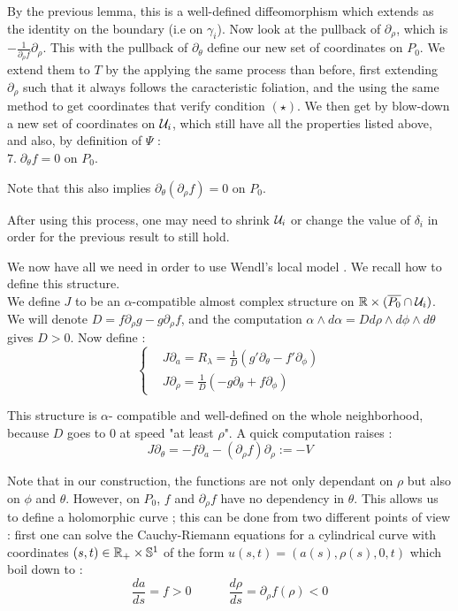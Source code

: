 \documentclass[../main.tex]{subfiles}
\begin{document}
By the previous lemma, this is a well-defined diffeomorphism which extends as the identity on the boundary (i.e on $\gamma_i$). Now look at the pullback of $\partial_\rho$, which is $-\frac{1}{\partial_\rho f}\partial_\rho$. This with the pullback of $\partial_\theta$ define our new set of coordinates on $P_0$. We extend them to $T$ by the applying the same process than before, first extending $\partial_\rho$ such that it always follows the caracteristic foliation, and the using the same method to get coordinates that verify condition $(\star)$. We then get by blow-down a new set of coordinates on $\mathcal{U}_i$, which still have all the properties listed above, and also, by definition of $\Psi$ :\\

$7. \; \partial_\theta f = 0 $ on $P_0$.

\begin{remark}
    Note that this also implies $\partial_\theta(\partial_\rho f) =0$ on $P_0$.
\end{remark}

\begin{remark}
    After using this process, one may need to shrink $\mathcal{U}_i$ or change the value of $\delta_i$ in order for the previous result to still hold.
\end{remark}

We now have all we need in order to use Wendl's local model \cite{wendl_open_2009}. We recall how to define this structure.\\

We define $J$ to be an $\alpha$-compatible almost complex structure on $\mathbb{R}\times (\overline{P_0}\cap \mathcal{U}_i)$. We will denote $D = f\partial_\rho g - g\partial_\rho f$, and the computation $\alpha\wedge d\alpha = Dd\rho\wedge d\phi\wedge d\theta$ gives $D>0$. Now define :
$$\left\{
    \begin{array}{ll}
        & J\partial_a = R_\lambda = \frac{1}{D}(g'\partial_\theta - f'\partial_\phi) \\
        & J\partial_\rho = \frac{1}{D}(-g\partial_\theta + f\partial_\phi) 
    \end{array}
\right.$$

This structure is $\alpha$- compatible and well-defined on the whole neighborhood, because $D$ goes to $0$ at speed "at least $\rho$". A quick computation raises :
$$J\partial_\theta = -f\partial_a - (\partial_\rho f)\partial_\rho := -V$$

Note that in our construction, the functions are not only dependant on $\rho$ but also on $\phi$ and $\theta$. However, on $P_0$, $f$ and $\partial_\rho f$ have no dependency in $\theta$. This allows us to define a holomorphic curve ; this can be done from two different points of view : first one can solve the Cauchy-Riemann equations for a cylindrical curve with coordinates $(s,t)\in \mathbb{R}_+\times \mathbb{S}^1$ of the form $u(s,t) = (a(s),\rho(s),0,t)$ which boil down to :
$$\frac{da}{ds} = f>0\quad\quad\quad \frac{d\rho}{ds} = \partial_\rho f(\rho) < 0$$
\end{document}
